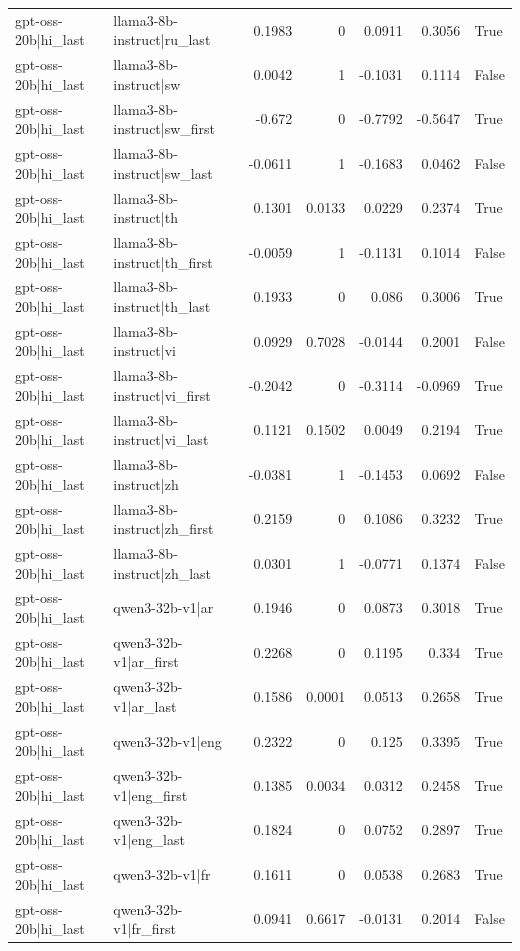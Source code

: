 \begin{table}
\begin{tabular}{l l r r r r l}
gpt-oss-20b|hi_last & llama3-8b-instruct|ru_last & 0.1983 & 0 & 0.0911 & 0.3056 & True \\
gpt-oss-20b|hi_last & llama3-8b-instruct|sw & 0.0042 & 1 & -0.1031 & 0.1114 & False \\
gpt-oss-20b|hi_last & llama3-8b-instruct|sw_first & -0.672 & 0 & -0.7792 & -0.5647 & True \\
gpt-oss-20b|hi_last & llama3-8b-instruct|sw_last & -0.0611 & 1 & -0.1683 & 0.0462 & False \\
gpt-oss-20b|hi_last & llama3-8b-instruct|th & 0.1301 & 0.0133 & 0.0229 & 0.2374 & True \\
gpt-oss-20b|hi_last & llama3-8b-instruct|th_first & -0.0059 & 1 & -0.1131 & 0.1014 & False \\
gpt-oss-20b|hi_last & llama3-8b-instruct|th_last & 0.1933 & 0 & 0.086 & 0.3006 & True \\
gpt-oss-20b|hi_last & llama3-8b-instruct|vi & 0.0929 & 0.7028 & -0.0144 & 0.2001 & False \\
gpt-oss-20b|hi_last & llama3-8b-instruct|vi_first & -0.2042 & 0 & -0.3114 & -0.0969 & True \\
gpt-oss-20b|hi_last & llama3-8b-instruct|vi_last & 0.1121 & 0.1502 & 0.0049 & 0.2194 & True \\
gpt-oss-20b|hi_last & llama3-8b-instruct|zh & -0.0381 & 1 & -0.1453 & 0.0692 & False \\
gpt-oss-20b|hi_last & llama3-8b-instruct|zh_first & 0.2159 & 0 & 0.1086 & 0.3232 & True \\
gpt-oss-20b|hi_last & llama3-8b-instruct|zh_last & 0.0301 & 1 & -0.0771 & 0.1374 & False \\
gpt-oss-20b|hi_last & qwen3-32b-v1|ar & 0.1946 & 0 & 0.0873 & 0.3018 & True \\
gpt-oss-20b|hi_last & qwen3-32b-v1|ar_first & 0.2268 & 0 & 0.1195 & 0.334 & True \\
gpt-oss-20b|hi_last & qwen3-32b-v1|ar_last & 0.1586 & 0.0001 & 0.0513 & 0.2658 & True \\
gpt-oss-20b|hi_last & qwen3-32b-v1|eng & 0.2322 & 0 & 0.125 & 0.3395 & True \\
gpt-oss-20b|hi_last & qwen3-32b-v1|eng_first & 0.1385 & 0.0034 & 0.0312 & 0.2458 & True \\
gpt-oss-20b|hi_last & qwen3-32b-v1|eng_last & 0.1824 & 0 & 0.0752 & 0.2897 & True \\
gpt-oss-20b|hi_last & qwen3-32b-v1|fr & 0.1611 & 0 & 0.0538 & 0.2683 & True \\
gpt-oss-20b|hi_last & qwen3-32b-v1|fr_first & 0.0941 & 0.6617 & -0.0131 & 0.2014 & False \\

\end{tabular}
\end{table}
